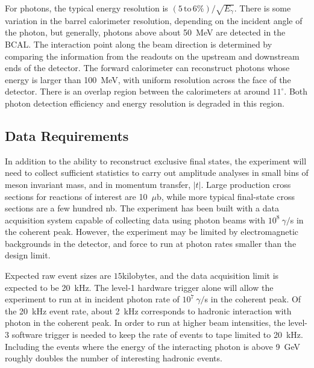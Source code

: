 For photons, the typical energy resolution is $(5\,\mathrm{to}\,6\%)/\sqrt{E_{\gamma}}$. There is some 
variation in the barrel calorimeter resolution, depending on the incident angle of the photon,
but generally, photons above about 50~MeV are detected in the BCAL. The interaction point
along the beam direction is determined by comparing the information from the readouts on the 
upstream and downstream ends of the detector. The forward calorimeter can reconstruct photons
whose energy is larger than 100~MeV, with uniform resolution across the face of the detector.
There is an overlap region between the calorimeters at around $11^{\circ}$. Both photon detection 
efficiency and energy resolution is degraded in this region. 
 
\subsection{Data Requirements \label{sec:intro:data_requirements}}
In addition to the ability to reconstruct exclusive final states, the \GX{} experiment
will need to collect sufficient statistics to carry out amplitude analyses in small bins 
of meson invariant mass, and in momentum transfer, $|t|$. Large production cross
sections for reactions of interest are 10~$\mu$b, while more typical final-state 
cross sections are a few hundred nb. The \GX{} experiment has been built with a 
data acquisition system capable of collecting data using photon beams with $10^{8}~\gamma/$s
in the coherent peak. However, the experiment may be limited by electromagnetic backgrounds
in the detector, and force to run at photon  rates smaller than the design limit.

Expected raw event sizes are $15$kilobytes, and the data acquisition limit is expected to 
be 20~kHz. The level-1 hardware trigger alone will allow the experiment to run 
at in incident photon rate of $10^{7}~\gamma/$s in the coherent peak. Of the 20~kHz
event rate, about 2~kHz corresponds to hadronic interaction with photon in the coherent
peak. In order to run at higher beam intensities, the level-3 software trigger is needed to 
keep the rate of events to tape limited to 20~kHz. Including the events where the energy
of the interacting photon is above 9~GeV roughly doubles the number of interesting hadronic
events. 

